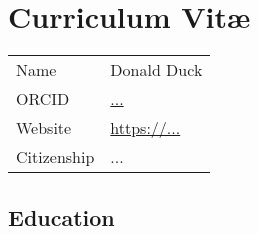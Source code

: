 
\newcommand{\experienceyearwidth}{1.5cm}
\newcommand{\experiencemonthwidth}{1.1cm}
\newcommand{\experience}[7]{%
    \noindent
	\begin{tabular}{@{} p{\experiencemonthwidth} @{} p{\experienceyearwidth} @{} p{\dimexpr\linewidth - \experienceyearwidth - \experiencemonthwidth\relax} @{}}
		{\leavevmode #1} & {\leavevmode #2} & {\leavevmode #5} \hfill \emph{\leavevmode #6} \\
		{\leavevmode #3} & {\leavevmode #4} & {\leavevmode #7} \\
	\end{tabular}
    \vspace{.3em}
}
\newcommand{\experienceShort}[4]{%
    \noindent
	\begin{tabular}{@{} p{\experiencemonthwidth} @{} p{\experienceyearwidth} @{} p{\dimexpr\linewidth - \experienceyearwidth - \experiencemonthwidth\relax} @{}}
		{\leavevmode #1} & {\leavevmode #2} & {\leavevmode #3} \hfill \emph{\leavevmode #4} \\
	\end{tabular}
    \vspace{-.9em}
}
\newcommand{\teaching}[3]{%
    \noindent
	\begin{tabular}{@{} p{\linewidth} @{}}
		{\leavevmode #1} \hfill \emph{\leavevmode #2} \\
		{\leavevmode #3} \\
	\end{tabular}
    \vspace{.3em}
}

\chapter{Curriculum Vit\ae}

\begin{tabular}{@{} p{\dimexpr \experienceyearwidth + \experiencemonthwidth\relax} @{} l}
    Name & Donald Duck \\
    ORCID & \href{https://orcid.org/...}{...} \\
    Website & \url{https://...} \\
    Citizenship & ...
\end{tabular}

\section*{Education}

